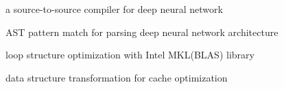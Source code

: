 \documentclass[]{deedy-resume-openfont}
\begin{document}
\begin{minipage}[t]{0.66\textwidth}
\sectionsep

\begin{tightemize}
\item a source-to-source compiler for deep neural network %
\item AST pattern match for parsing deep neural network architecture
\item loop structure optimization with Intel MKL(BLAS) library
\item data structure transformation for cache optimization
\end{tightemize}
\sectionsep


\end{minipage}
\end{document}

